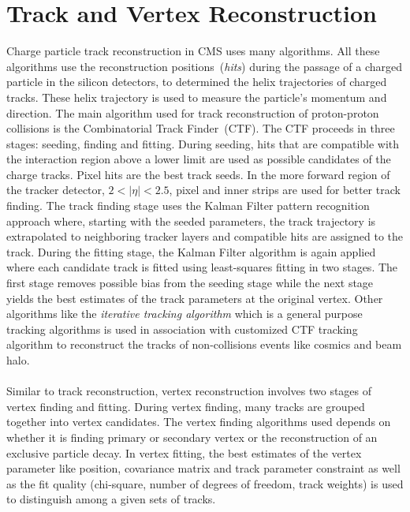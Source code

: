 \section{Track and Vertex Reconstruction}
Charge particle track reconstruction in CMS uses many algorithms. All these algorithms use the reconstruction positions~(\textit{hits}) during the passage of a charged particle in the silicon detectors, to determined the helix trajectories of charged tracks. These helix trajectory is used to measure the particle's momentum and direction.
\newline
The main algorithm used for track reconstruction of proton-proton collisions is the Combinatorial Track Finder~(CTF). The CTF proceeds in three stages: seeding, finding and fitting.
During seeding, hits that are compatible with the interaction region above a lower \pt limit are used as possible candidates of the charge tracks. Pixel hits are the best track seeds. In the more forward region of the tracker detector, $2 <|\eta| < 2.5$, pixel and inner strips are used for better track finding. The track finding stage uses the Kalman Filter pattern recognition approach where, starting with the seeded parameters, the track trajectory is extrapolated to neighboring tracker layers and compatible hits are assigned to the track. During the fitting stage, the Kalman Filter algorithm is again applied where each candidate track is fitted using least-squares fitting in two stages. The first stage removes possible bias from the seeding stage while the next stage yields the best estimates of the track parameters at the original vertex.
Other algorithms like the \textit{iterative tracking algorithm} which is a general purpose tracking algorithms is used in association with customized CTF tracking algorithm to reconstruct the tracks of non-collisions  events like cosmics and beam halo.
\paragraph*{}
Similar to track reconstruction, vertex reconstruction involves two stages of vertex finding and fitting. During vertex finding, many tracks are grouped together into vertex candidates. The vertex finding algorithms used depends on whether it is finding primary or secondary vertex or the reconstruction of an exclusive particle decay. In vertex fitting, the best estimates of the vertex parameter like position, covariance matrix and track parameter constraint as well as the fit quality (chi-square, number of degrees of freedom, track weights) is used to distinguish among a given sets of tracks.

